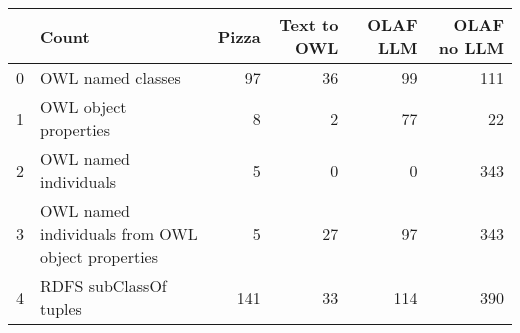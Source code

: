 \begin{tabular}{llrrrr}
\toprule
 & Count & Pizza & Text to OWL & OLAF LLM & OLAF no LLM \\
\midrule
0 & OWL named classes & 97 & 36 & 99 & 111 \\
1 & OWL object properties & 8 & 2 & 77 & 22 \\
2 & OWL named individuals & 5 & 0 & 0 & 343 \\
3 & OWL named individuals from OWL object properties & 5 & 27 & 97 & 343 \\
4 & RDFS subClassOf tuples & 141 & 33 & 114 & 390 \\
\bottomrule
\end{tabular}
